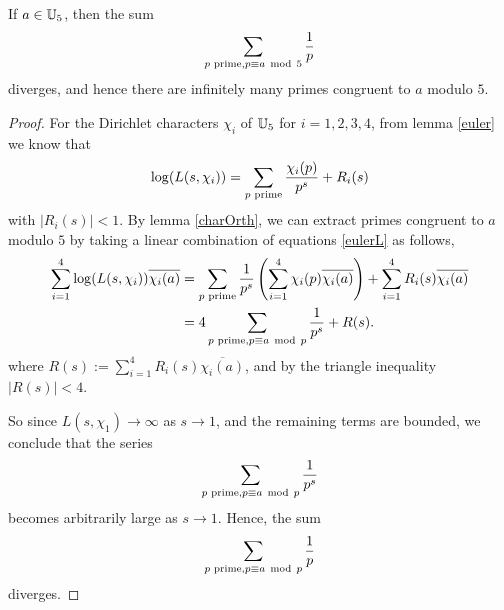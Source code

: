 \documentclass{unswmaths}
\begin{document}
    \begin{theorem}
        If $a \in \mathbb{U}_5$, then the sum
        \begin{equation*}
            \sum_{{p\text{ prime}}, p \equiv a \;\operatorname{mod}\;5} \frac{1}{p}
        \end{equation*}
        diverges, and hence there are infinitely many primes congruent to $a$ modulo $5$.
    \end{theorem}
    \begin{proof}
        For the Dirichlet characters $\chi_i$ of $\mathbb{U}_5$ for $i = 1,2,3,4$, from lemma \ref{euler} we know that
        \begin{equation*}
        \label{eulerL}
            \log(L(s,\chi_i)) = \sum_{{p\text{ prime}}} \frac{\chi_i(p)}{p^s}+R_i(s)
        \end{equation*}
        with $|R_i(s)| < 1$. By lemma \ref{charOrth}, we can extract primes congruent to $a$ modulo $5$
        by taking a linear combination of equations \ref{eulerL} as follows,
        \begin{align*}
            \sum_{i=1}^4 \log(L(s,\chi_i))\overline{\chi_i(a)} &= \sum_{{p\text{ prime}}} \frac{1}{p^s}\left(\sum_{i=1}^4 \chi_i(p)\overline{\chi_i(a)}\right) + \sum_{i=1}^4 R_i(s)\overline{\chi_i(a)}\\
            &= 4\sum_{{p\text{ prime}}, p\equiv a\;\operatorname{mod}\;p} \frac{1}{p^s} + R(s).
        \end{align*}
        where $R(s) := \sum_{i=1}^4 R_i(s)\overline{\chi_i(a)}$, and by the triangle inequality $|R(s)| < 4$.
        
        So since $L(s,\chi_1) \rightarrow \infty$ as $s\rightarrow 1$, and the remaining terms are bounded, we
        conclude that the series
        \begin{equation*}
            \sum_{{p\text{ prime}}, p\equiv a\;\operatorname{mod}\;p} \frac{1}{p^s}
        \end{equation*}
        becomes arbitrarily large as $s\rightarrow 1$. Hence, 
        the sum
        \begin{equation*}
            \sum_{{p\text{ prime}}, p\equiv a\;\operatorname{mod}\;p} \frac{1}{p}
        \end{equation*}
        diverges.
    \end{proof} 
    
    
\end{document}
